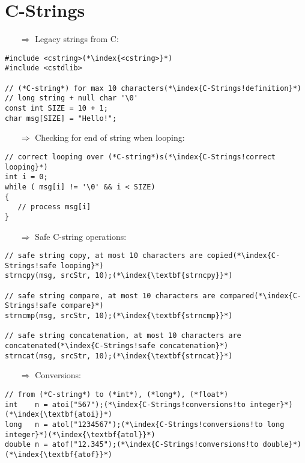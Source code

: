 \documentclass[10pt]{article}
\begin{document}
\section{C-Strings}
\small
\begin{enumerate}
\item[$\Rightarrow$] Legacy strings from C:
\end{enumerate}
\begin{lstlisting}
#include <cstring>(*\index{<cstring>}*)
#include <cstdlib>

// (*C-string*) for max 10 characters(*\index{C-Strings!definition}*)
// long string + null char '\0'
const int SIZE = 10 + 1;
char msg[SIZE] = "Hello!";
\end{lstlisting}
\begin{enumerate}
\item[$\Rightarrow$] Checking for end of string when looping:
\end{enumerate}
\begin{lstlisting}
// correct looping over (*C-string*)s(*\index{C-Strings!correct looping}*)
int i = 0;
while ( msg[i] != '\0' && i < SIZE)
{
   // process msg[i]
}
\end{lstlisting}
\begin{enumerate}
\item[$\Rightarrow$] Safe C-string operations:
\end{enumerate}
\begin{lstlisting}
// safe string copy, at most 10 characters are copied(*\index{C-Strings!safe looping}*)
strncpy(msg, srcStr, 10);(*\index{\textbf{strncpy}}*)

// safe string compare, at most 10 characters are compared(*\index{C-Strings!safe compare}*)
strncmp(msg, srcStr, 10);(*\index{\textbf{strncmp}}*)

// safe string concatenation, at most 10 characters are concatenated(*\index{C-Strings!safe concatenation}*)
strncat(msg, srcStr, 10);(*\index{\textbf{strncat}}*)
\end{lstlisting}
\begin{enumerate}
\item[$\Rightarrow$] Conversions:
\end{enumerate}
\begin{lstlisting}
// from (*C-string*) to (*int*), (*long*), (*float*)
int    n = atoi("567");(*\index{C-Strings!conversions!to integer}*)(*\index{\textbf{atoi}}*)
long   n = atol("1234567");(*\index{C-Strings!conversions!to long integer}*)(*\index{\textbf{atol}}*)
double n = atof("12.345");(*\index{C-Strings!conversions!to double}*)(*\index{\textbf{atof}}*)
\end{lstlisting}
%
%
\end{document}
